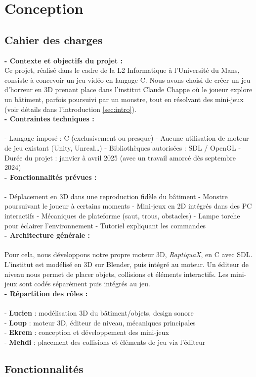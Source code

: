 \newpage
\section{Conception}

\subsection{Cahier des charges}

\textbf{- Contexte et objectifs du projet :}\\

Ce projet, réalisé dans le cadre de la L2 Informatique à l’Université du Mans, consiste à concevoir un jeu vidéo en langage C. Nous avons choisi de créer un jeu d’horreur en 3D prenant place dans l’institut Claude Chappe où le joueur explore un bâtiment, parfois poursuivi par un monstre, tout en résolvant des mini-jeux (voir détails dans l'introduction \ref{sec:intro}).\\

\textbf{- Contraintes techniques :}\\\\
- Langage imposé : C (exclusivement ou presque)  
- Aucune utilisation de moteur de jeu existant (Unity, Unreal…)  
- Bibliothèques autorisées : SDL / OpenGL  
- Durée du projet : janvier à avril 2025 (avec un travail amorcé dès septembre 2024)\\

\textbf{- Fonctionnalités prévues :}\\\\
- Déplacement en 3D dans une reproduction fidèle du bâtiment  
- Monstre poursuivant le joueur à certains moments  
- Mini-jeux en 2D intégrés dans des PC interactifs  
- Mécaniques de plateforme (saut, trous, obstacles)  
- Lampe torche pour éclairer l’environnement  
- Tutoriel expliquant les commandes\\

\textbf{- Architecture générale :}\\\\
Pour cela, nous développons notre propre moteur 3D, \textit{RaptiquaX}, en C avec SDL. L’institut est modélisé en 3D sur Blender, puis intégré au moteur. Un éditeur de niveau nous permet de placer objets, collisions et éléments interactifs. Les mini-jeux sont codés séparément puis intégrés au jeu.\\

\textbf{- Répartition des rôles :}\\\\
- \textbf{Lucien} : modélisation 3D du bâtiment/objets, design sonore\\ 
- \textbf{Loup} : moteur 3D, éditeur de niveau, mécaniques principales\\  
- \textbf{Ekrem} : conception et développement des mini-jeux  \\
- \textbf{Mehdi} : placement des collisions et éléments de jeu via l’éditeur\\

\newpage
\subsection{Fonctionnalités}
\newpage